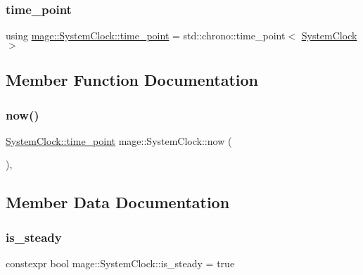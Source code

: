 \subsubsection{\texorpdfstring{time\+\_\+point}{time\_point}}
{\footnotesize\ttfamily using \hyperlink{structmage_1_1_system_clock_a00c052d5e1349785a6847fbfb9e1f044}{mage\+::\+System\+Clock\+::time\+\_\+point} =  std\+::chrono\+::time\+\_\+point$<$ \hyperlink{structmage_1_1_system_clock}{System\+Clock} $>$}



\subsection{Member Function Documentation}
\hypertarget{structmage_1_1_system_clock_a4e4ef603bf70620810aa205b1eb89bc6}{}\label{structmage_1_1_system_clock_a4e4ef603bf70620810aa205b1eb89bc6} 
\subsubsection{\texorpdfstring{now()}{now()}}
{\footnotesize\ttfamily \hyperlink{structmage_1_1_system_clock_a00c052d5e1349785a6847fbfb9e1f044}{System\+Clock\+::time\+\_\+point} mage\+::\+System\+Clock\+::now (\begin{DoxyParamCaption}{ }\end{DoxyParamCaption})\hspace{0.3cm}{\ttfamily [static]}, {\ttfamily [noexcept]}}



\subsection{Member Data Documentation}
\hypertarget{structmage_1_1_system_clock_ad7cdec95a6032ab973ed02da26ddd3f0}{}\label{structmage_1_1_system_clock_ad7cdec95a6032ab973ed02da26ddd3f0} 
\subsubsection{\texorpdfstring{is\+\_\+steady}{is\_steady}}
{\footnotesize\ttfamily constexpr bool mage\+::\+System\+Clock\+::is\+\_\+steady = true\hspace{0.3cm}{\ttfamily [static]}}

